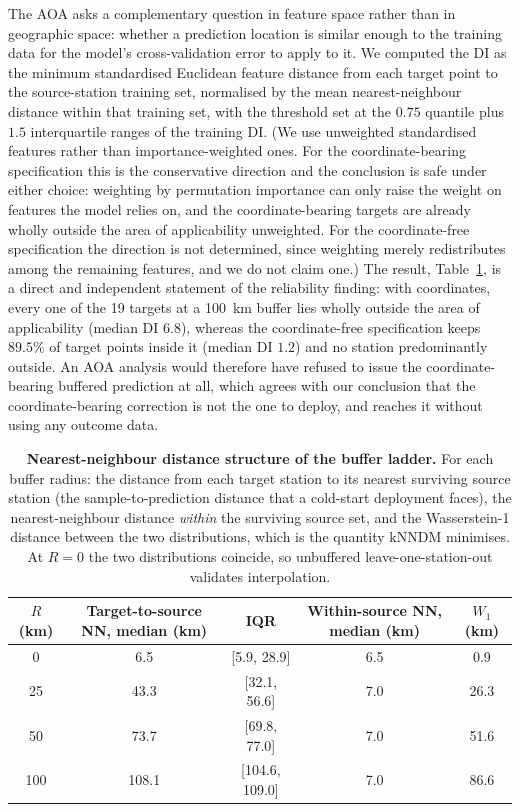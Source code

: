 \documentclass[11pt]{article}
\begin{document}
The AOA asks a complementary question in feature space rather than in geographic space:
whether a prediction location is similar enough to the training data for the model's
cross-validation error to apply to it. We computed the DI as the minimum standardised
Euclidean feature distance from each target point to the source-station training set,
normalised by the mean nearest-neighbour distance within that training set, with the
threshold set at the $0.75$ quantile plus $1.5$ interquartile ranges of the training DI.
(We use unweighted standardised features rather than importance-weighted ones. For the
coordinate-bearing specification this is the conservative direction and the conclusion is
safe under either choice: weighting by permutation importance can only raise the weight on
features the model relies on, and the coordinate-bearing targets are already wholly outside
the area of applicability unweighted. For the coordinate-free specification the direction is
not determined, since weighting merely redistributes among the remaining features, and we do
not claim one.) The result, Table~\ref{si:t27}, is a direct and independent statement of
the reliability finding: with coordinates, every one of the 19 targets at a 100~km buffer
lies wholly outside the area of applicability (median DI $6.8$), whereas the
coordinate-free specification keeps $89.5\%$ of target points inside it (median DI $1.2$)
and no station predominantly outside. An AOA analysis would therefore have refused to
issue the coordinate-bearing buffered prediction at all, which agrees with our conclusion
that the coordinate-bearing correction is not the one to deploy, and reaches it without
using any outcome data.

\begin{table}[htbp]\centering\footnotesize
\caption{\textbf{Nearest-neighbour distance structure of the buffer ladder.} For each buffer radius: the distance from each target station to its nearest surviving source station (the sample-to-prediction distance that a cold-start deployment faces), the nearest-neighbour distance \emph{within} the surviving source set, and the Wasserstein-1 distance between the two distributions, which is the quantity kNNDM minimises. At $R=0$ the two distributions coincide, so unbuffered leave-one-station-out validates interpolation.}
\label{si:t27}
\begin{tabular}{ccccc}\toprule
$R$ (km) & Target-to-source NN, median (km) & IQR & Within-source NN, median (km) & $W_1$ (km) \\ \midrule
0 & 6.5 & [5.9, 28.9] & 6.5 & 0.9 \\
25 & 43.3 & [32.1, 56.6] & 7.0 & 26.3 \\
50 & 73.7 & [69.8, 77.0] & 7.0 & 51.6 \\
100 & 108.1 & [104.6, 109.0] & 7.0 & 86.6 \\
\bottomrule\end{tabular}\end{table}
\end{document}
